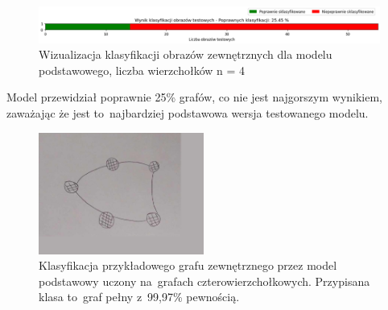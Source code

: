 \begin{figure}[ht]
	\centering
	\includegraphics[width=15.5cm]{resources/tests/images/v3/base4_bar.png}
	\caption{Wizualizacja klasyfikacji obrazów zewnętrznych dla modelu podstawowego, liczba wierzchołków n = 4}
	\label{Fig:tests-base-1c}
\end{figure}
\FloatBarrier

Model przewidział poprawnie 25\% grafów, co nie jest najgorszym wynikiem,
zaważając że jest to~najbardziej podstawowa wersja testowanego modelu.

\begin{figure}[ht]
	\centering
	\includegraphics[height=4cm]{../graph_classification/test_graphs/drawn/cycle-1.png}
	\caption{Klasyfikacja przykładowego grafu zewnętrznego przez model podstawowy uczony na~grafach czterowierzchołkowych.
		Przypisana klasa to~graf pełny z~99,97\% pewnością.}
	\label{Fig:tests-base-1d}
\end{figure}
\FloatBarrier




